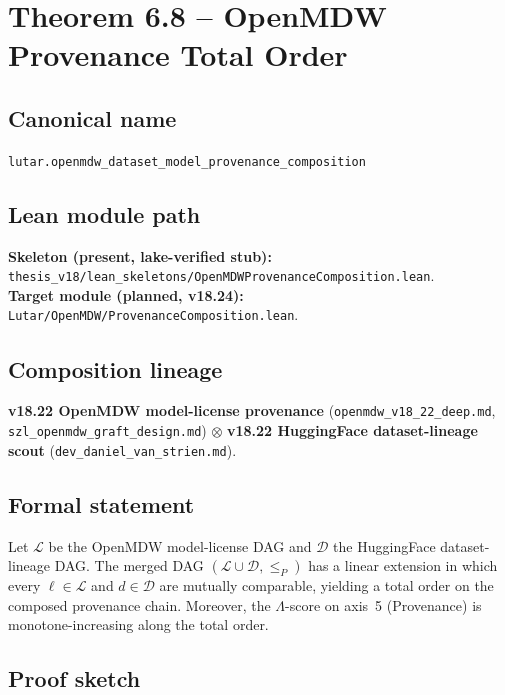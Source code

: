 \section{Theorem 6.8 -- OpenMDW Provenance Total Order}
\label{sec:thm08}

\subsection*{Canonical name}
\verb|lutar.openmdw_dataset_model_provenance_composition|

\subsection*{Lean module path}
\textbf{Skeleton (present, lake-verified stub):}
\texttt{thesis\_v18/lean\_skeletons/OpenMDWProvenanceComposition.lean}.\\
\textbf{Target module (planned, v18.24):}
\texttt{Lutar/OpenMDW/ProvenanceComposition.lean}.

\subsection*{Composition lineage}
\textbf{v18.22 OpenMDW model-license provenance}
(\texttt{openmdw\_v18\_22\_deep.md},
\texttt{szl\_openmdw\_graft\_design.md}) $\otimes$
\textbf{v18.22 HuggingFace dataset-lineage scout}
(\texttt{dev\_daniel\_van\_strien.md}).

\subsection*{Formal statement}

\begin{theorem}
\label{thm:openmdw-provenance}
Let $\mathcal{L}$ be the OpenMDW model-license DAG and
$\mathcal{D}$ the HuggingFace dataset-lineage DAG.  The merged
DAG $(\mathcal{L} \cup \mathcal{D}, \leq_P)$ has a linear extension
in which every $\ell \in \mathcal{L}$ and $d \in \mathcal{D}$ are
mutually comparable, yielding a total order on the composed
provenance chain.  Moreover, the \(\Lambda\)-score on axis~5 (Provenance)
is monotone-increasing along the total order.
\end{theorem}

\subsection*{Proof sketch}

